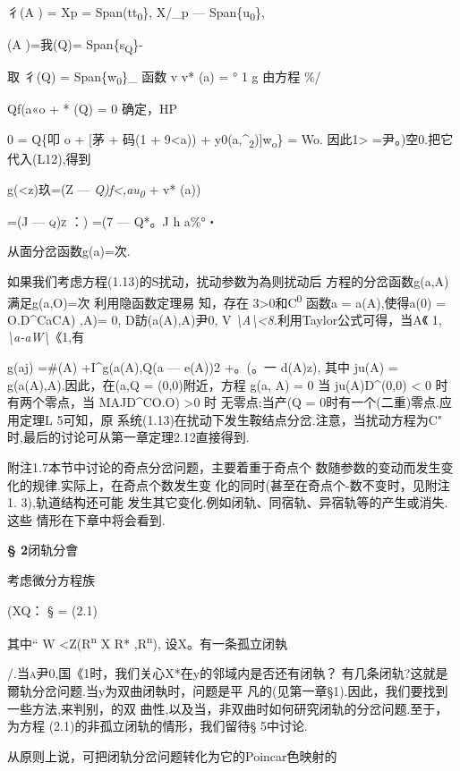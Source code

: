 \documentclass{article}
\begin{document}
彳(A ) = Xp = Span(tt\textsubscript{0}\}, X/\_p ---
Span\{u\textsubscript{0}\},

(A )=我(Q)= Span\{s\textsubscript{Q}\}-

取 彳(Q) = Span\{w\textsubscript{0}\}\_ 函数 v v* (a) = ° 1 g 由方程 \%/

Qf(a«o + * (Q) = 0 确定，HP

0 = Q\{叩 o + {[}茅 + 码(1 + 9\textless{}a)) +
y0(a,\^{}\textsubscript{2}){]}w\textsubscript{o}\} = Wo.
因此1\textgreater{} =尹。)空0.把它代入(L12),得到

g(\textless{}z)玖=(Z --- \emph{Q)f\textless{},au\textsubscript{0}} + v*
(a))

=(J --- \textsc{q)z} ：) =(7 --- Q*。J h a\%°・

从面分岔函数g(a)=次.

如果我们考虑方程(1.13)的S扰动，扰动参数为為则扰动后
方程的分岔函数g(a,A)满足g(a,O)=次 利用隐函数定理易 知，存在
3\textgreater{}0和C\textsuperscript{0} 函数a = a(A),使得a(0) =
O.D\^{}CaCA) ,A)= 0, D訪(a(A),A)尹0, V
\emph{\textbackslash{}A\textbackslash{}\textless{}8.}利用Taylor公式可得，当\textbar{}A\textbar{}《
1, \emph{\textbackslash{}a-aW\textbackslash{}}《1,有

g(aj) =\#(A) +I\^{}g(a(A),Q(a --- e(A))2 +。(\textbar{}。一
d(A)\textbar{}z), 其中 ju(A) = g(a(A),A).因此，在(a,Q = (0,0)附近，方程
g(a, A) = 0 当 ju(A)D\^{}(0,0) \textless{} 0 时有两个零点，当
MAJD\^{}CO.O) \textgreater{}0 时 无零点;当产(Q =
0时有一个(二重)零点.应用定理L 5可知，原
系统(1.13)在扰动下发生鞍结点分岔.注意，当扰动方程为C"
时,最后的讨论可从第一章定理2.12直接得到.

附注1.7本节中讨论的奇点分岔问题，主要着重于奇点个
数随参数的变动而发生变化的规律.实际上，在奇点个数发生变
化的同时(甚至在奇点个-数不变时，见附注1. 3),轨道结构还可能
发生其它变化.例如闭轨、同宿轨、异宿轨等的产生或消失.这些
情形在下章中将会看到.

\textbf{§ 2}闭轨分會

考虑微分方程族

(XQ： § = (2.1)

其中`` W \textless{}Z(R\textsuperscript{n} X R* ,R\textsuperscript{n}),
设X。有一条孤立闭執

/.当\textsc{a}尹0,国《1时，我们关心X*在y的邻域内是否还有闭執？
有几条闭轨?这就是爾轨分岔问题.当y为双曲闭執时，问题是平
凡的(见第一章§1).因此，我们要找到一些方法,来判别，的双
曲性,以及当，非双曲时如何研究闭轨的分岔问题.至于，为方程
(2.1)的非孤立闭轨的情形，我们留待§ 5中讨论.

从原则上说，可把闭轨分岔问题转化为它的Poincar色映射的
\end{document}
